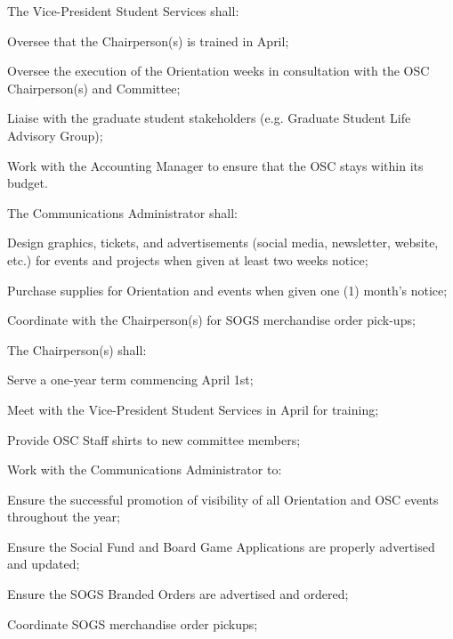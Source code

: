 \begin{longenum}[ label*=\thesubsection.\arabic*., align=left]
\begin{longenum}[label*=\arabic*., align=left]
		\item The Vice-President Student Services shall:
			\begin{longenum}[label*=\arabic*., align=left]
			\item Oversee that the Chairperson(s) is trained in April;
			\item Oversee the execution of the Orientation weeks in consultation with the OSC Chairperson(s) and Committee;			
			\item Liaise with the graduate student stakeholders (e.g. Graduate Student Life Advisory Group);
			\item Work with the Accounting Manager to ensure that the OSC stays within its budget.
			\end{longenum}
		\item The Communications Administrator shall:		
			\begin{longenum}[label*=\arabic*., align=left]
			\item Design graphics, tickets, and advertisements (social media, newsletter, website, etc.) for events and projects when given at least two weeks notice;
			\item Purchase supplies for Orientation and events when given one (1) month's notice;
			\item Coordinate with the Chairperson(s) for SOGS merchandise order pick-ups;
			\end{longenum}			
		\item The Chairperson(s) shall:
			\begin{longenum}[label*=\arabic*., align=left]
			\item Serve a one-year term commencing April 1st;
			\item Meet with the Vice-President Student Services in April for training;
			\item Provide OSC Staff shirts to new committee members;
			\item Work with the Communications Administrator to:
				\begin{longenum}[label*=\arabic*., align=left]			
				\item Ensure the successful promotion of visibility of all Orientation and OSC events throughout the year;
				\item Ensure the Social Fund and Board Game Applications are properly advertised and updated;
				\item Ensure the SOGS Branded Orders are advertised and ordered;
				\item Coordinate SOGS merchandise order pickups;

\end{longenum}
\end{longenum}
\end{longenum}
\end{longenum}
